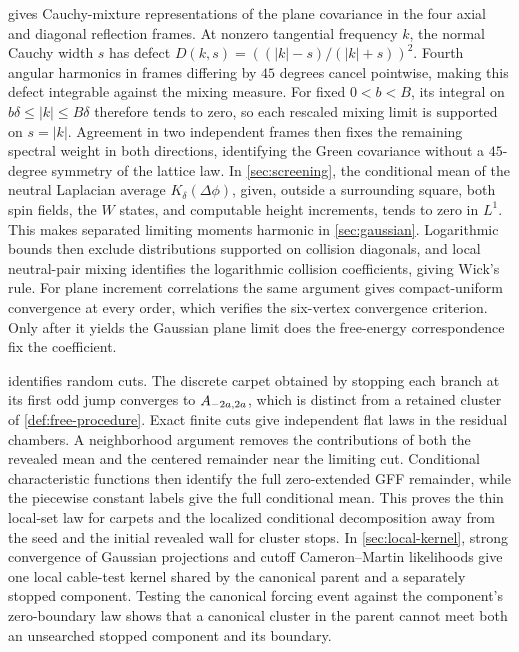  gives Cauchy-mixture representations of the plane
covariance in the four axial and diagonal reflection frames. At nonzero tangential
frequency \(k\), the normal Cauchy width \(s\) has defect
\(D(k,s)=((|k|-s)/(|k|+s))^2\). Fourth angular harmonics in frames differing
by \(45\) degrees cancel pointwise, making this defect integrable against
the mixing measure. For fixed \(0<b<B\), its integral on
\(b\delta\le|k|\le B\delta\) therefore tends to zero, so each rescaled
mixing limit is supported on \(s=|k|\).
Agreement in two independent frames then fixes the remaining spectral weight
in both directions, identifying the Green covariance without a
\(45\)-degree symmetry of the lattice law. In \cref{sec:screening}, the conditional mean of the neutral
Laplacian average \(K_\delta(\Delta\phi)\), given, outside a surrounding square,
both spin fields, the \(W\) states, and computable height increments, tends to zero in \(L^1\). This makes separated
limiting moments harmonic in \cref{sec:gaussian}. Logarithmic bounds then
exclude distributions supported on collision diagonals, and local neutral-pair
mixing identifies the logarithmic collision coefficients, giving Wick's rule.
For plane increment correlations the same argument gives compact-uniform
convergence at every order, which verifies the six-vertex convergence
criterion. Only after it yields the Gaussian plane limit does the free-energy
correspondence fix the coefficient.

 identifies random cuts. The discrete carpet obtained
by stopping each branch at its first odd jump converges to
\(A_{-2a,2a}\), which is distinct from a retained cluster of
\cref{def:free-procedure}. Exact finite cuts give independent flat laws in
the residual chambers. A neighborhood argument removes the contributions
of both the revealed mean and the centered remainder near the limiting cut.
Conditional characteristic functions then identify the full zero-extended
GFF remainder, while the piecewise constant labels give the full conditional
mean. This proves the thin local-set law for carpets and the localized
conditional decomposition away from the seed and the initial revealed wall
for cluster stops.
In \cref{sec:local-kernel},
strong convergence of Gaussian projections and cutoff Cameron--Martin
likelihoods give one local cable-test kernel shared by the canonical parent
and a separately stopped component. Testing the canonical forcing event
against the component's zero-boundary law shows that a canonical cluster in
the parent cannot meet both an unsearched stopped component and its boundary.

